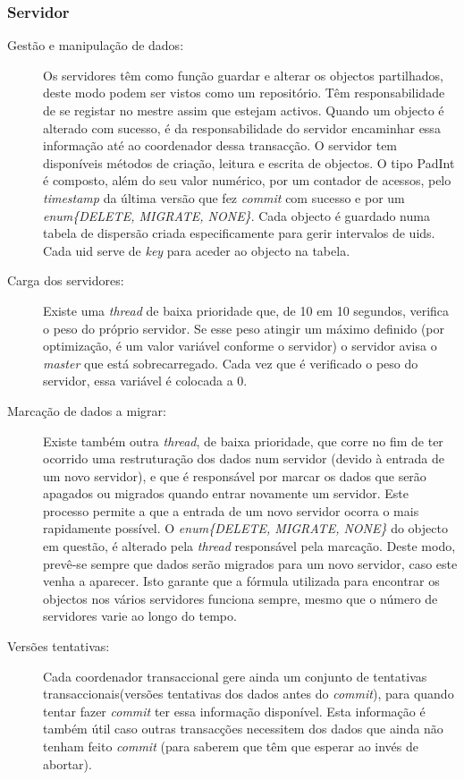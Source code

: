 \subsubsection{Servidor}

\begin{description}

\item[Gestão e manipulação de dados:]
Os servidores têm como função guardar e alterar os objectos partilhados, deste modo podem ser vistos como um repositório. Têm responsabilidade de se registar no mestre assim que estejam activos. Quando um objecto é alterado com sucesso, é da responsabilidade do servidor encaminhar essa informação até ao coordenador dessa transacção. O servidor tem disponíveis métodos de criação, leitura e escrita de objectos. O tipo PadInt é composto, além do seu valor numérico, por um contador de acessos, pelo \textit{timestamp} da última versão que fez \textit{commit} com sucesso e por um \textit{enum\{DELETE, MIGRATE, NONE\}}. Cada objecto é guardado numa  tabela de dispersão criada especificamente para gerir intervalos de uids. Cada uid serve de \textit{key} para aceder ao objecto na tabela.

\item[Carga dos servidores:]
Existe uma \textit{thread} de baixa prioridade que, de 10 em 10 segundos, verifica o peso do próprio servidor. Se esse peso atingir um máximo definido (por optimização, é um valor variável conforme o servidor) o servidor avisa o \textit{master} que está sobrecarregado. Cada vez que é verificado o peso do servidor, essa variável é colocada a 0.

\item[Marcação de dados a migrar:]
Existe também outra \textit{thread}, de baixa prioridade, que corre no fim de ter ocorrido uma restruturação dos dados num servidor (devido à entrada de um novo servidor), e que é responsável por marcar os dados que serão apagados ou migrados quando entrar novamente um servidor. Este processo permite a que a entrada de um novo servidor ocorra o mais rapidamente possível. O \textit{enum\{DELETE, MIGRATE, NONE\}} do objecto em questão, é alterado pela \textit{thread} responsável pela marcação. Deste modo, prevê-se sempre que dados serão migrados para um novo servidor, caso este venha a aparecer. Isto garante que a fórmula utilizada para encontrar os objectos nos vários servidores funciona sempre, mesmo que o número de servidores varie ao longo do tempo.

\item[Versões tentativas:]
Cada coordenador transaccional gere ainda um conjunto de tentativas transaccionais(versões tentativas dos dados antes do \textit{commit}), para quando tentar fazer \textit{commit} ter essa informação disponível. Esta informação é também útil caso outras transacções necessitem dos dados que ainda não tenham feito \textit{commit} (para saberem que têm que esperar ao invés de abortar).


\end{description}
